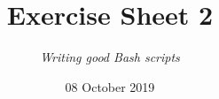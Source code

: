 




\title{{\huge\textbf{Exercise Sheet 2}}}
\author{\textit{Writing good Bash scripts}}
\date{{\small 08 October 2019}}


    \maketitle
    \bigskip
    
    \bigskip
    
    \newpage
    
    \bigskip
    
    \bigskip
    
